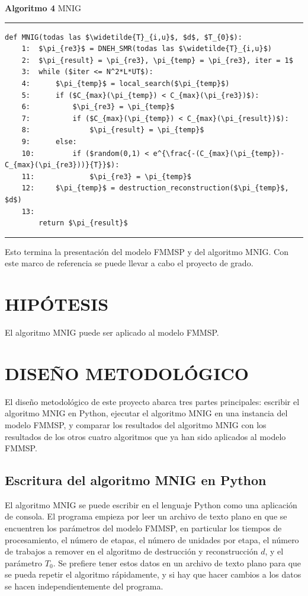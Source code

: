 \documentclass{article}
\begin{document}
\textbf{Algoritmo 4} MNIG

\noindent\noindent
\rule{\linewidth}{0.4pt}

\begin{lstlisting}[mathescape=true]
    def MNIG(todas las $\widetilde{T}_{i,u}$, $d$, $T_{0}$):
    1:  $\pi_{re3}$ = DNEH_SMR(todas las $\widetilde{T}_{i,u}$)
    2:  $\pi_{result} = \pi_{re3}, \pi_{temp} = \pi_{re3}, iter = 1$
    3:  while ($iter <= N^2*L*UT$):
    4:      $\pi_{temp}$ = local_search($\pi_{temp}$)
    5:      if ($C_{max}(\pi_{temp}) < C_{max}(\pi_{re3})$):
    6:          $\pi_{re3} = \pi_{temp}$
    7:          if ($C_{max}(\pi_{temp}) < C_{max}(\pi_{result})$):
    8:              $\pi_{result} = \pi_{temp}$
    9:      else:
    10:         if ($random(0,1) < e^{\frac{-(C_{max}(\pi_{temp})-C_{max}(\pi_{re3}))}{T}}$):
    11:             $\pi_{re3} = \pi_{temp}$
    12:     $\pi_{temp}$ = destruction_reconstruction($\pi_{temp}$, $d$)
    13:
        return $\pi_{result}$
\end{lstlisting}

\noindent\noindent
\rule{\linewidth}{0.4pt}

\vspace{\baselineskip}
Esto termina la presentación del modelo FMMSP y del algoritmo MNIG. Con este
marco de referencia se puede llevar a cabo el proyecto de grado.

\section{HIPÓTESIS}

El algoritmo MNIG puede ser aplicado al modelo FMMSP.

\section{DISEÑO METODOLÓGICO}

El diseño metodológico de este proyecto abarca tres partes principales: escribir
el algoritmo MNIG en Python, ejecutar el algoritmo MNIG en una instancia del
modelo FMMSP, y comparar los resultados del algoritmo MNIG con los resultados de
los otros cuatro algoritmos que ya han sido aplicados al modelo FMMSP.

\subsection{Escritura del algoritmo MNIG en Python}

El algoritmo MNIG se puede escribir en el lenguaje Python como una aplicación
de consola. El programa empieza por leer un archivo de texto plano en que se
encuentren los parámetros del modelo FMMSP, en particular los tiempos de
procesamiento, el número de etapas, el número de unidades por etapa, el
número de trabajos a remover en el algoritmo de destrucción y reconstrucción
$d$, y el parámetro $T_{0}$. Se prefiere tener estos datos en un archivo de
texto plano para que se pueda repetir el algoritmo rápidamente, y si hay que
hacer cambios a los datos se hacen independientemente del programa.
\end{document}

